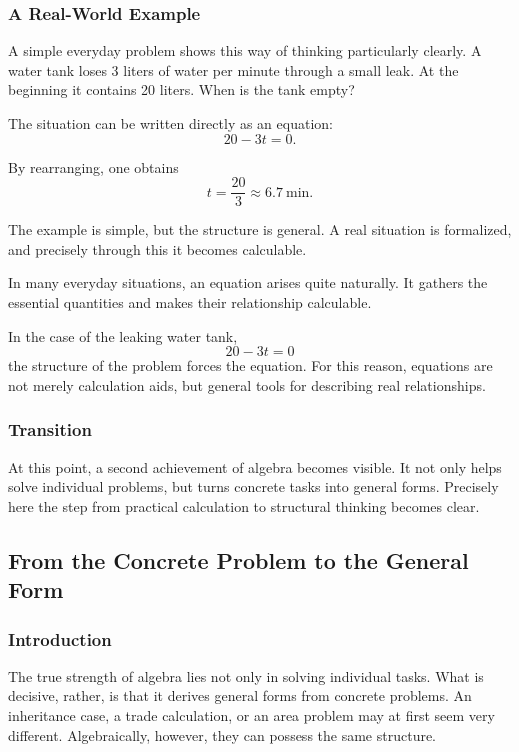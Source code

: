 \subsubsection*{A Real-World Example}
A simple everyday problem shows this way of thinking particularly clearly.
A water tank loses 3 liters of water per minute
through a small leak.
At the beginning it contains 20 liters.
When is the tank empty?

The situation can be written directly as an equation:
\[
20 - 3t = 0.
\]

By rearranging, one obtains
\[
t = \frac{20}{3} \approx \SI{6.7}{\minute}.
\]

The example is simple,
but the structure is general.
A real situation is formalized,
and precisely through this it becomes calculable.

\begin{DidacticBox}
	\label{box:reality}
	In many everyday situations, an equation arises quite naturally.
	It gathers the essential quantities
	and makes their relationship calculable.
	
	In the case of the leaking water tank,
	\[
	20 - 3t = 0
	\]
	the structure of the problem forces the equation.
	For this reason, equations are not merely calculation aids,
	but general tools for describing real relationships.
\end{DidacticBox}

\subsubsection*{Transition}
At this point, a second achievement of algebra becomes visible.
It not only helps solve individual problems,
but turns concrete tasks into general forms.
Precisely here the step from practical calculation
to structural thinking becomes clear.


\subsection{From the Concrete Problem to the General Form}
\label{sec:3.4_general_form}

\subsubsection*{Introduction}
The true strength of algebra lies not only
in solving individual tasks.
What is decisive, rather,
is that it derives general forms from concrete problems.
An inheritance case, a trade calculation, or an area problem
may at first seem very different.
Algebraically, however, they can possess the same structure.

